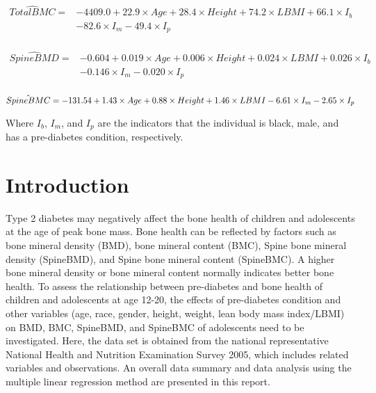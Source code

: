 \documentclass[11pt]{article}
\begin{document}
\begin{equation}
\begin{split}
\hat{TotalBMC} = &-4409.0 +22.9\times Age +28.4\times Height +74.2\times LBMI + 66.1\times I_b \\
& -82.6\times I_m -49.4\times I_p\\
\end{split}
\end{equation}

\begin{equation}
\begin{split}
\hat{SpineBMD} = &-0.604 +0.019\times Age +0.006\times Height +0.024\times LBMI + 0.026\times I_b\\
& -0.146\times I_m -0.020\times I_p\\
\end{split}
\end{equation}

\begin{equation}
\hat{SpineBMC} = -131.54 +1.43\times Age +0.88\times Height +1.46\times LBMI -6.61\times I_m -2.65\times I_p\\
\end{equation}

Where $I_b$, $I_m$, and $I_p$ are the indicators that the individual is black, male, and has a pre-diabetes condition, respectively.

\newpage
\section{Introduction}
\setcounter{page}{1}
Type 2 diabetes may negatively affect the bone health of children and adolescents at the age of peak bone mass. Bone health can be reflected by factors such as bone mineral density (BMD), bone mineral content (BMC), Spine bone mineral density (SpineBMD), and Spine bone mineral content (SpineBMC). A higher bone mineral density or bone mineral content normally indicates better bone health. To assess the relationship between pre-diabetes and bone health of children and adolescents at age 12-20, the effects of pre-diabetes condition and other variables (age, race, gender, height, weight, lean body mass index/LBMI) on BMD, BMC, SpineBMD, and SpineBMC of adolescents need to be investigated. Here, the data set is obtained from the national representative National Health and Nutrition Examination Survey 2005, which includes related variables and observations. An overall data summary and data analysis using the multiple linear regression method are presented in this report.   
\end{document}
